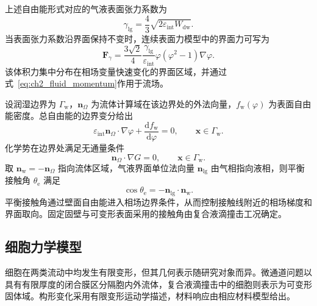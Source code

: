 上述自由能形式对应的气液表面张力系数为
\begin{equation}
\gamma_{\mathrm{lg}}
=
\frac{4}{3}
\sqrt{2\varepsilon_{\mathrm{int}}W_{\mathrm{dw}}}.
\label{eq:ch2_surface_tension_relation}
\end{equation}
当表面张力系数沿界面保持不变时，连续表面力模型中的界面力可写为
\begin{equation}
\boldsymbol{F}_{\gamma}
=
\frac{3\sqrt{2}}{4}
\frac{\gamma_{\mathrm{lg}}}{\varepsilon_{\mathrm{int}}}
\varphi\left(\varphi^2-1\right)
\nabla\varphi.
\label{eq:ch2_phase_surface_force}
\end{equation}
该体积力集中分布在相场变量快速变化的界面区域，并通过式~\eqref{eq:ch2_fluid_momentum}作用于流场。

设润湿边界为 $\Gamma_{\mathrm w}$，$\boldsymbol{n}_{\Omega}$ 为流体计算域在该边界处的外法向量，$f_{\mathrm w}(\varphi)$ 为表面自由能密度。总自由能的边界变分给出
\begin{equation}
\varepsilon_{\mathrm{int}}
\boldsymbol{n}_{\Omega}\cdot\nabla\varphi
+
\frac{\mathrm df_{\mathrm w}}{\mathrm d\varphi}
=0,
\qquad
\boldsymbol{x}\in\Gamma_{\mathrm w}.
\label{eq:ch2_wetting_bc}
\end{equation}
化学势在边界处满足无通量条件
\begin{equation}
\boldsymbol{n}_{\Omega}\cdot\nabla G=0,
\qquad
\boldsymbol{x}\in\Gamma_{\mathrm w}.
\label{eq:ch2_chemical_no_flux}
\end{equation}
取 $\boldsymbol{n}_{\mathrm w}=-\boldsymbol{n}_{\Omega}$ 指向流体区域，气液界面单位法向量 $\boldsymbol{n}_{\mathrm{lg}}$ 由气相指向液相，则平衡接触角 $\theta_{\mathrm e}$ 满足
\begin{equation}
\cos\theta_{\mathrm e}
=
-\boldsymbol{n}_{\mathrm{lg}}\cdot\boldsymbol{n}_{\mathrm w}.
\label{eq:ch2_contact_angle_geometry}
\end{equation}
平衡接触角通过壁面自由能进入相场边界条件，从而控制接触线附近的相场梯度和界面取向。固定固壁与可变形表面采用的接触角由复合液滴撞击工况确定\cite{deGennes1985wetting,bonn2009wetting,snoeijer2013moving}。

\subsection{细胞力学模型}
\label{subsec:ch2_cell_mechanics}

细胞在两类流动中均发生有限变形，但其几何表示随研究对象而异。微通道问题以具有有限厚度的闭合膜区分隔胞内外流体，复合液滴撞击中的细胞则表示为可变形固体域。构形变化采用有限变形运动学描述，材料响应由相应材料模型给出。

